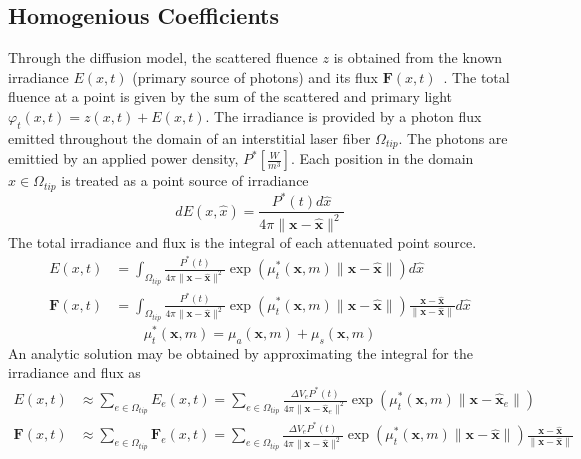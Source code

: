 \documentclass{article}         %
\theoremstyle{definition}
\theoremstyle{remark}
\begin{document}
\subsection{Homogenious Coefficients}
Through the diffusion model,
the scattered fluence $z$ is obtained from the 
known irradiance $E(x,t)$ (primary source of photons) 
and its flux $\textbf{F}(x,t)$~\cite{fuentesetal10a}.
The total fluence at a point is given by the
sum of the scattered and primary light $\varphi_t(x,t) = z(x,t) + E(x,t)$.
The irradiance is provided by a photon flux emitted throughout
the domain of an interstitial laser fiber $\Omega_{tip}$.
The photons are emittied by an applied power density,
$P^* \left[\frac{W}{m^3}\right]$. Each position in the domain 
$\hat{x} \in \Omega_{tip}$
is treated as a point source of irradiance
\[
dE(x,\hat{x})= 
             \frac{P^*(t)d\hat{x}}{4\pi \|\textbf{x} -
\hat{\textbf{x}}\|^2}
\]
The total irradiance and flux is the integral of each attenuated point source.
\[
\begin{split}
E(x,t) & = \int_{\Omega_{tip}} 
             \frac{P^*(t)}{4\pi \|\textbf{x} - \hat{\textbf{x}}\|^2}
             \exp\left(\mu_t^*(\textbf{x},m)
                         \|\textbf{x} - \hat{\textbf{x}}\|\right) d\hat{x}
 \\
\textbf{F}(x,t) & = \int_{\Omega_{tip}} 
             \frac{P^*(t)}{4\pi \|\textbf{x} - \hat{\textbf{x}}\|^2}
             \exp\left(\mu_t^*(\textbf{x},m) 
                         \|\textbf{x} - \hat{\textbf{x}}\|\right) 
\frac{\textbf{x} - \hat{\textbf{x}} }{ \|\textbf{x} - \hat{\textbf{x}}\| }
d\hat{x}
\end{split} 
\]
\[
  \mu_t^*(\textbf{x},m)  = 
                 \mu_a(\textbf{x},m) + 
                 \mu_s(\textbf{x},m)  
\]
An analytic solution may be obtained by approximating the integral for
the irradiance and flux as
\[
\begin{split}
E(x,t) 
  & \approx 
  \sum_{e\in \Omega_{tip}} E_e(x,t)
  =
  \sum_{e\in \Omega_{tip}} 
          \frac{\Delta V_e P^*(t)}{4\pi \|\textbf{x} - \hat{\textbf{x}}_e\|^2}
          \exp\left(\mu_t^*(\textbf{x},m) 
                 \|\textbf{x} - \hat{\textbf{x}}_e\|\right) 
 \\
\textbf{F}(x,t) 
  & \approx 
    \sum_{e\in \Omega_{tip}} \textbf{F}_e(x,t) 
  = \sum_{e\in \Omega_{tip}} 
          \frac{\Delta V_e P^*(t)}{4\pi \|\textbf{x} - \hat{\textbf{x}}\|^2}
          \exp\left(\mu_t^*(\textbf{x},m) 
                         \|\textbf{x} - \hat{\textbf{x}}\|\right) 
\frac{\textbf{x} - \hat{\textbf{x}} }{ \|\textbf{x} - \hat{\textbf{x}}\| }
\end{split} 
\]
\end{document}
